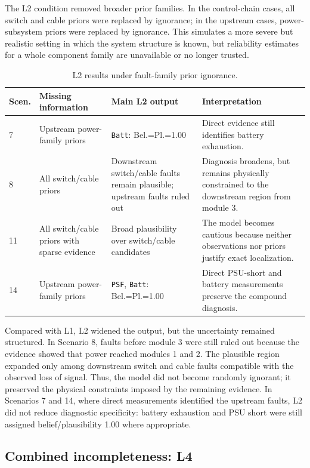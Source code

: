 \documentclass[runningheads]{llncs}
\begin{document}
The L2 condition removed broader prior families. In the control-chain cases, all switch and cable priors were replaced by ignorance; in the upstream cases, power-subsystem priors were replaced by ignorance. This simulates a more severe but realistic setting in which the system structure is known, but reliability estimates for a whole component family are unavailable or no longer trusted.

\begin{table}[H]
\caption{L2 results under fault-family prior ignorance.}\label{tab:l2_results}
\centering
\small
\begin{tabularx}{\textwidth}{p{0.9cm}p{3.0cm}p{4.0cm}X}
\toprule
Scen. & Missing information & Main L2 output & Interpretation \\
\midrule
7 & Upstream power-family priors & \texttt{Batt}: Bel.=Pl.=1.00 & Direct evidence still identifies battery exhaustion. \\
8 & All switch/cable priors & Downstream switch/cable faults remain plausible; upstream faults ruled out & Diagnosis broadens, but remains physically constrained to the downstream region from module 3. \\
11 & All switch/cable priors with sparse evidence & Broad plausibility over switch/cable candidates & The model becomes cautious because neither observations nor priors justify exact localization. \\
14 & Upstream power-family priors & \texttt{PSF}, \texttt{Batt}: Bel.=Pl.=1.00 & Direct PSU-short and battery measurements preserve the compound diagnosis. \\
\bottomrule
\end{tabularx}
\end{table}

Compared with L1, L2 widened the output, but the uncertainty remained structured. In Scenario 8, faults before module 3 were still ruled out because the evidence showed that power reached modules 1 and 2. The plausible region expanded only among downstream switch and cable faults compatible with the observed loss of signal. Thus, the model did not become randomly ignorant; it preserved the physical constraints imposed by the remaining evidence. In Scenarios 7 and 14, where direct measurements identified the upstream faults, L2 did not reduce diagnostic specificity: battery exhaustion and PSU short were still assigned belief/plausibility 1.00 where appropriate.

\subsection{Combined incompleteness: L4}
\label{sec:l4_combined_incompleteness}
\end{document}

